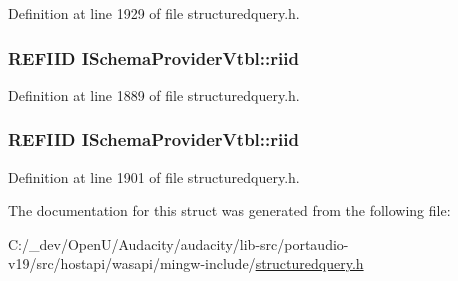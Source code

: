 Definition at line 1929 of file structuredquery.\+h.

\subsubsection[{\texorpdfstring{riid}{riid}}]{ {\bf R\+E\+F\+I\+ID} I\+Schema\+Provider\+Vtbl\+::riid}\hypertarget{struct_i_schema_provider_vtbl_a6e74123e89914a4bad51108607afcfa4}{}\label{struct_i_schema_provider_vtbl_a6e74123e89914a4bad51108607afcfa4}


Definition at line 1889 of file structuredquery.\+h.

\subsubsection[{\texorpdfstring{riid}{riid}}]{ {\bf R\+E\+F\+I\+ID} I\+Schema\+Provider\+Vtbl\+::riid}\hypertarget{struct_i_schema_provider_vtbl_a6e74123e89914a4bad51108607afcfa4}{}\label{struct_i_schema_provider_vtbl_a6e74123e89914a4bad51108607afcfa4}


Definition at line 1901 of file structuredquery.\+h.



The documentation for this struct was generated from the following file\+:\begin{DoxyCompactItemize}
\item 
C\+:/\+\_\+dev/\+Open\+U/\+Audacity/audacity/lib-\/src/portaudio-\/v19/src/hostapi/wasapi/mingw-\/include/\hyperlink{structuredquery_8h}{structuredquery.\+h}\end{DoxyCompactItemize}
